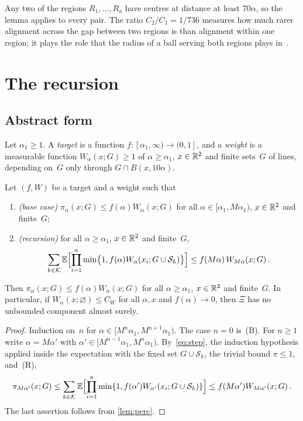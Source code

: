 \documentclass[11pt,letterpaper]{article}
\newcommand{\cS}{\mathcal S}
\begin{document}
Any two of the regions $R_1,\dots,R_a$ have centres at distance at least $70\alpha$, so the lemma applies to every pair. The ratio $C_2/C_1=1/736$ measures how much rarer alignment across the gap between two regions is than alignment within one region; it plays the role that the radius of a ball serving both regions plays in~\cite{Gou08}.

\section{The recursion}
\label{sec:recursion}

\subsection{Abstract form}

Let $\alpha_1\ge1$. A \emph{target} is a function $f\colon[\alpha_1,\infty)\to(0,1]$, and a \emph{weight} is a measurable function $W_\alpha(x;G)\ge1$ of $\alpha\ge\alpha_1$, $x\in\mathbb R^2$ and finite sets~$G$ of lines, depending on~$G$ only through $G\cap B(x,10\alpha)$.

\begin{theorem}[Recursion]
\label{thm:recursion}
Let $(f,W)$ be a target and a weight such that
\begin{enumerate}
  \item[\emph{(B)}] \emph{(base case)} $\pi_\alpha(x;G)\le f(\alpha)W_\alpha(x;G)$ for all $\alpha\in[\alpha_1,M\alpha_1)$, $x\in\mathbb R^2$ and finite~$G$;
  \item[\emph{(R)}] \emph{(recursion)} for all $\alpha\ge\alpha_1$, $x\in\mathbb R^2$ and finite~$G$,
  \begin{equation}
  \label{eq:R}
    \sum_{k\in\mathcal K}\E\Bigl[\prod_{i=1}^a\min\bigl\{1,f(\alpha)W_\alpha(x_i;G\cup\cS_k)\bigr\}\Bigr]\le f(M\alpha)\,W_{M\alpha}(x;G)\,.
  \end{equation}
\end{enumerate}
Then $\pi_\alpha(x;G)\le f(\alpha)W_\alpha(x;G)$ for all $\alpha\ge\alpha_1$, $x\in\mathbb R^2$ and finite~$G$. In particular, if $W_\alpha(x;\varnothing)\le C_W$ for all $\alpha,x$ and $f(\alpha)\to0$, then $\Xi$ has no unbounded component almost surely.
\end{theorem}

\begin{proof}
Induction on~$n$ for $\alpha\in[M^n\alpha_1,M^{n+1}\alpha_1)$. The case $n=0$ is~(B). For $n\ge1$ write $\alpha=M\alpha'$ with $\alpha'\in[M^{n-1}\alpha_1,M^n\alpha_1)$. By~\eqref{eq:step}, the induction hypothesis applied inside the expectation with the fixed set $G\cup\cS_k$, the trivial bound $\pi\le1$, and~(R),
\begin{equation*}
  \pi_{M\alpha'}(x;G)\le\sum_{k\in\mathcal K}\E\Bigl[\prod_{i=1}^a\min\{1,f(\alpha')W_{\alpha'}(x_i;G\cup\cS_k)\}\Bigr]\le f(M\alpha')W_{M\alpha'}(x;G)\,.
\end{equation*}
The last assertion follows from \cref{lem:perc}.
\end{proof}
\end{document}
